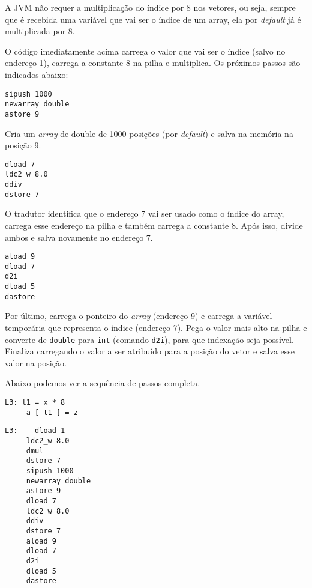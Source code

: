 A JVM não requer a multiplicação do índice por 8 nos vetores, ou seja, sempre que é recebida uma variável que vai ser o índice de um array, ela por \textit{default} já é multiplicada por 8.

O código imediatamente acima carrega o valor que vai ser o índice (salvo no endereço 1), carrega a constante 8 na pilha e multiplica. Os próximos passos são indicados abaixo:

\begin{lstlisting}
sipush 1000
newarray double
astore 9
\end{lstlisting}

Cria um \textit{array} de double de 1000 posições (por \textit{default}) e salva na memória na posição 9.

\begin{lstlisting}
dload 7
ldc2_w 8.0
ddiv
dstore 7
\end{lstlisting}

O tradutor identifica que o endereço 7 vai ser usado como o índice do array, carrega esse endereço na pilha e também carrega a constante 8. Após isso, divide ambos e salva novamente no endereço 7.

\begin{lstlisting}
aload 9
dload 7
d2i
dload 5
dastore
\end{lstlisting}

Por último, carrega o ponteiro do \textit{array} (endereço 9) e  carrega a variável temporária que representa o índice (endereço 7). Pega o valor mais alto na pilha e converte de \texttt{double} para \texttt{int} (comando \texttt{d2i}), para que indexação seja possível. Finaliza carregando o valor a ser atribuído para a posição do vetor e salva esse valor na posição. 

Abaixo podemos ver a sequência de passos completa.


\begin{lstlisting}[caption=Atribuição para posição de vetor em código intermediário.]
L3:	t1 = x * 8
     a [ t1 ] = z
\end{lstlisting}

\begin{lstlisting}[caption=Atribuição para posição de vetor em Jasmin.]
L3:    dload 1
     ldc2_w 8.0
     dmul
     dstore 7
     sipush 1000
     newarray double
     astore 9
     dload 7
     ldc2_w 8.0
     ddiv
     dstore 7
     aload 9
     dload 7
     d2i
     dload 5
     dastore
\end{lstlisting}


